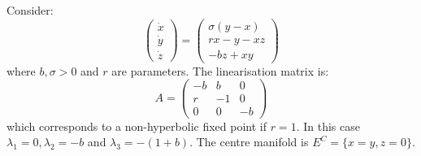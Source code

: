 \documentclass[../Main.tex]{subfiles}
\begin{document}
\begin{example}
    Consider: %
    \begin{equation*}
        \begin{pmatrix}\dot x \\ \dot y \\ \dot z\end{pmatrix} = \begin{pmatrix}\sigma(y-x) \\ rx - y - xz \\ -bz + xy\end{pmatrix}
    \end{equation*}
    where $b, \sigma > 0$ and $r$ are parameters. The linearisation matrix is:
    \begin{equation*}
        A =
        \begin{pmatrix}
            -b & b & 0 \\
            r & -1 & 0 \\
            0 & 0 & -b
        \end{pmatrix}
    \end{equation*}
    which corresponds to a non-hyperbolic fixed point if $r = 1$. In this case $\lambda_1 = 0, \lambda_2 = -b$ and $\lambda_3 = -(1+b)$. The centre manifold is $E^C = \{x = y, z = 0\}$.


\end{example}
\end{document}
